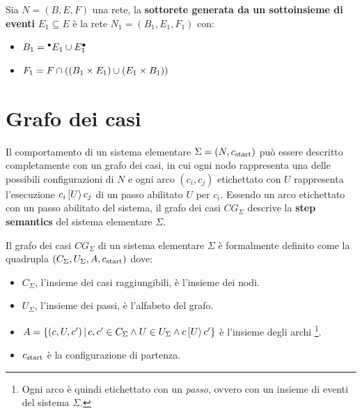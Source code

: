 \begin{defn}
    Sia $N = (B, E, F)$ una rete, la \textbf{sottorete generata da un sottoinsieme di eventi} $E_1 \subseteq E$ è la rete $N_1 = (B_1, E_1, F_1)$ con:
    \begin{itemize}
        \item $B_1 = {^\bullet}E_1 \cup E_1^\bullet$
        \item $F_1 = F \cap \left(\left(B_1 \times E_1\right) \cup \left(E_1 \times B_1\right)\right)$
    \end{itemize}
\end{defn}

\section{Grafo dei casi}
Il comportamento di un sistema elementare $\Sigma = (N, c_{\textnormal{start}})$ può essere descritto completamente con un grafo dei casi, in cui ogni nodo rappresenta una delle possibili configurazioni di $N$ e ogni arco $(c_i, c_j)$ etichettato con $U$ rappresenta l'esecuzione $c_i\,[U\rangle\,c_j$ di un passo abilitato $U$ per $c_i$. Essendo un arco etichettato con un passo abilitato del sistema, il grafo dei casi $CG_{\Sigma}$ descrive la \textbf{step semantics} del sistema elementare $\Sigma$.

\begin{defn}
    Il grafo dei casi $CG_{\Sigma}$ di un sistema elementare $\Sigma$ è formalmente definito come la quadrupla $(C_{\Sigma}, U_{\Sigma}, A, c_{\textnormal{start}})$ dove:
    \begin{itemize}
        \item $C_{\Sigma}$, l'insieme dei casi raggiungibili, è l'insieme dei nodi.
        \item $U_{\Sigma}$, l'insieme dei passi, è l'alfabeto del grafo.
        \item $A = \left\{(c, U, c') \, | \, c, c' \in C_{\Sigma} \land U \in U_{\Sigma} \land c\,[U\rangle\,c'\right\}$ è l'insieme degli archi \footnote{Ogni arco è quindi etichettato con un \textit{passo}, ovvero con un insieme di eventi del sistema $\Sigma$.}.
        \item $c_{\textnormal{start}}$ è la configurazione di partenza.
    \end{itemize}
\end{defn}

